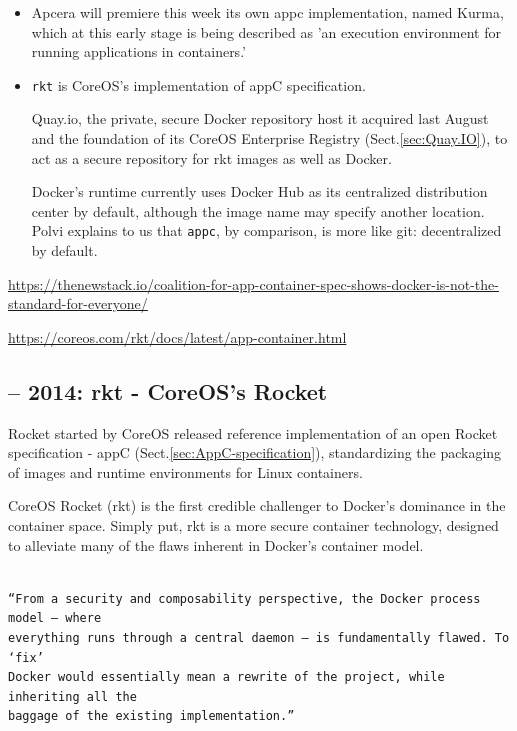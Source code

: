 \begin{itemize}
  
  \item  Apcera will premiere this week its own appc implementation, named
  Kurma, which at this early stage is being described as 'an execution
  environment for running applications in containers.'
  
  \item \verb!rkt! is CoreOS's implementation of appC specification.
  
  Quay.io, the private, secure Docker repository host it acquired last August
  and the foundation of its CoreOS Enterprise Registry (Sect.\ref{sec:Quay.IO}),
  to act as a secure repository for rkt images as well as Docker.
  
  Docker’s runtime currently uses Docker Hub as its centralized distribution
  center by default, although the image name may specify another location. Polvi
  explains to us that \verb!appc!, by comparison, is more like git: decentralized by
  default.
  
\end{itemize}

\url{https://thenewstack.io/coalition-for-app-container-spec-shows-docker-is-not-the-standard-for-everyone/}

\url{https://coreos.com/rkt/docs/latest/app-container.html}

\subsection{-- 2014: rkt - CoreOS's Rocket}
\label{sec:rkt-CoreOS}

Rocket started by CoreOS released reference implementation of an open Rocket
specification - appC (Sect.\ref{sec:AppC-specification}), standardizing the
packaging of images and runtime environments for Linux containers.

CoreOS Rocket (rkt) is the first credible challenger to Docker's dominance in
the container space. Simply put, rkt is a more secure container technology,
designed to alleviate many of the flaws inherent in Docker's container model.

\begin{verbatim}

“From a security and composability perspective, the Docker process model – where
everything runs through a central daemon – is fundamentally flawed. To ‘fix’
Docker would essentially mean a rewrite of the project, while inheriting all the
baggage of the existing implementation.”

\end{verbatim}


